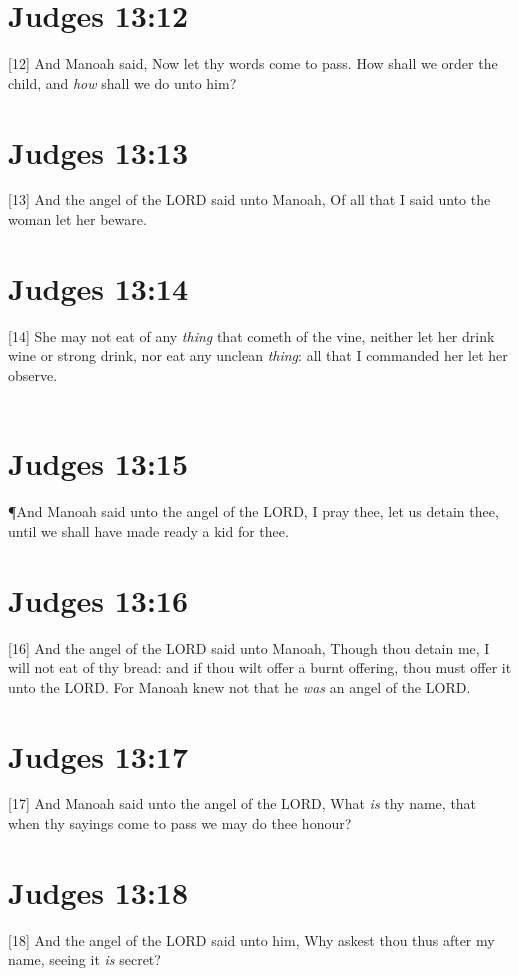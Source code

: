 \section{Judges 13:12}
[12] \textcolor[rgb]{0.00,0.00,1.00}{And Manoah said, Now let thy words come to pass. How shall we order the child, and \emph{how} shall we do unto him?}
\section{Judges 13:13}
[13] \textcolor[rgb]{0.00,0.00,1.00}{And the angel of the LORD said unto Manoah, Of all that I said unto the woman let her beware.}
\section{Judges 13:14}
[14] \textcolor[rgb]{0.00,0.00,1.00}{She may not eat of any \emph{thing} that cometh of the vine, neither let her drink wine or strong drink, nor eat any unclean \emph{thing}: all that I commanded her let her observe.}\\
\\
\section{Judges 13:15}
\P \textcolor[rgb]{0.00,0.00,1.00}{And Manoah said unto the angel of the LORD, I pray thee, let us detain thee, until we shall have made ready a kid for thee.}
\section{Judges 13:16}
[16] \textcolor[rgb]{0.00,0.00,1.00}{And the angel of the LORD said unto Manoah, Though thou detain me, I will not eat of thy bread: and if thou wilt offer a burnt offering, thou must offer it unto the LORD. For Manoah knew not that he \emph{was} an angel of the LORD.}
\section{Judges 13:17}
[17] \textcolor[rgb]{0.00,0.00,1.00}{And Manoah said unto the angel of the LORD, What \emph{is} thy name, that when thy sayings come to pass we may do thee honour?}
\section{Judges 13:18}
[18] \textcolor[rgb]{0.00,0.00,1.00}{And the angel of the LORD said unto him, Why askest thou thus after my name, seeing it \emph{is} secret?}

